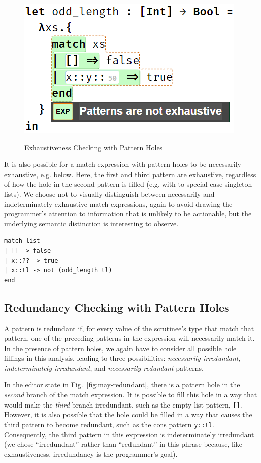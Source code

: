 \begin{figure}
{\includegraphics[scale=0.5]{imgs/not_exhaustive.png}
}
  \caption{Exhaustiveness Checking with Pattern Holes}
  \label{fig:exhaustiveness}
\end{figure}

It is also possible for a match expression with pattern holes to be necessarily exhaustive, e.g. below. Here, the first and third pattern are
exhaustive, regardless of how the hole in the second pattern is filled (e.g. with \li{[]} to special case singleton lists). We choose not to visually distinguish between necessarily and indeterminately exhaustive match expressions, again to avoid drawing
the programmer's attention to information that is unlikely to be actionable, but the
underlying semantic distinction is interesting to observe.
\begin{lstlisting}
match list
| [] -> false
| x::?? -> true
| x::tl -> not (odd_length tl)
end
\end{lstlisting}

\subsection{Redundancy Checking with Pattern Holes}
\label{sec:hazel-redundancy}
A pattern is redundant if, for every value of the scrutinee's type that match that pattern, one of the preceding patterns in the  expression will necessarily 
match it. In the presence of pattern holes, we again have to consider all possible hole fillings in this analysis, leading to three possibilities: \emph{necessarily irredundant}, \emph{indeterminately irredundant}, and \emph{necessarily redundant} patterns.

In the editor state in Fig.~\ref{fig:may-redundant}, there is a pattern hole in the \emph{second} branch of the match expression. It is possible to fill this hole in a way that would make the \emph{third} branch irredundant, such as the empty list pattern, \texttt{[]}. 
However, it is also possible that the hole could be filled in a way that causes the third pattern to become redundant, such as the cons pattern \texttt{y::tl}. Consequently, the third pattern in this  expression is indeterminately irredundant (we chose ``irredundant'' rather than ``redundant'' in this phrase because, like exhaustiveness, irredundancy is the programmer's goal).

